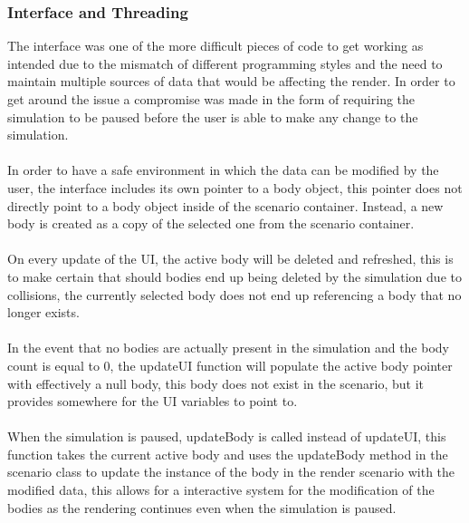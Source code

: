 \pagebreak

\subsubsection{Interface and Threading}
The interface was one of the more difficult pieces of code to get working as intended due to the mismatch of different programming styles and the need to maintain multiple sources of data that would be affecting the render. In order to get around the issue a compromise was made in the form of requiring the simulation to be paused before the user is able to make any change to the simulation.

\paragraph{}
In order to have a safe environment in which the data can be modified by the user, the interface includes its own pointer to a body object, this pointer does not directly point to a body object inside of the scenario container. Instead, a new body is created as a copy of the selected one from the scenario container.

\paragraph{}
On every update of the UI, the active body will be deleted and refreshed, this is to make certain that should bodies end up being deleted by the simulation due to collisions, the currently selected body does not end up referencing a body that no longer exists.

\paragraph{}
In the event that no bodies are actually present in the simulation and the body count is equal to 0, the updateUI function will populate the active body pointer with effectively a null body, this body does not exist in the scenario, but it provides somewhere for the UI variables to point to.

\paragraph{}
When the simulation is paused, updateBody is called instead of updateUI, this function takes the current active body and uses the updateBody method in the scenario class to update the instance of the body in the render scenario with the modified data, this allows for a interactive system for the modification of the bodies as the rendering continues even when the simulation is paused.

